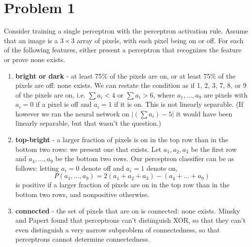 \documentclass{article}
\begin{document}
\section*{Problem 1}

Consider training a single perceptron with the perceptron activation rule.
Assume that an image is a $3\times 3$ array of pixels, with each pixel 
being on or off. For each of the following features, either present a 
perceptron that recognizes the feature or prove none exists.
\begin{enumerate}
\item \textbf{bright or dark} - at least 75\% of the pixels are on, or 
at least 75\% of the pixels are off: none exists.
We can restate the condition as if 1, 2, 3, 7, 8, or 9 of the pixels are on,
i.e. $\sum a_i<4$ or $\sum a_i>6$, where $a_1,\ldots,a_9$ are pixels with $a_i=0$ if a pixel
is off and $a_i=1$ if it is on. This is not linearly separable. 
(If however we ran the neural network on $|\left(\sum a_i\right) -5|$ it would
have been linearly separable, but that wasn't the question.)

\item \textbf{top-bright} - a larger fraction of pixels is on in the top
row than in the bottom two rows: we present one that exists. 
Let $a_1,a_2,a_3$ be the first row and
$a_4,\ldots,a_9$ be the bottom two rows. Our perceptron classifier can
be as follows: letting $a_i=0$ denote off and $a_i=1$ denote on, 
$$P(a_1,\ldots,a_9)=2(a_1+a_2+a_3)-(a_4+\ldots+a_9)$$
is positive if a larger fraction of pixels are on in the top row than
in the bottom two rows, and nonpositive otherwise. 

\item \textbf{connected} - the set of pixels that are on is connected: 
none exists. Minsky and Papert found that perceptrons can't distinguish
XOR, so that they can't even distinguish a very narrow subproblem of
connectedness, so that perceptrons cannot determine connectedness. 
\end{enumerate}
\end{document}

